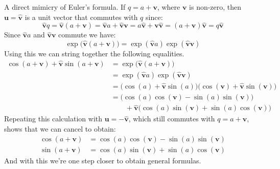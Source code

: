 \documentclass{article}
\begin{document}
            A direct mimicry of Euler's formula. If
            $q=a+\mathbf{v}$, where $\mathbf{v}$ is non-zero,
            then $\mathbf{u}=\hat{\mathbf{v}}$ is a unit vector that commutes
            with $q$ since:
            \begin{equation}
                \hat{\mathbf{v}}q
                =\hat{\mathbf{v}}(a+\mathbf{v})
                =\hat{\mathbf{v}}a+\hat{\mathbf{v}}\mathbf{v}
                =a\hat{\mathbf{v}}+\mathbf{v}\hat{\mathbf{v}}
                =(a+\mathbf{v})\hat{\mathbf{v}}
                =q\hat{\mathbf{v}}
            \end{equation}
            Since $\hat{\mathbf{v}}a$ and $\hat{\mathbf{v}}\mathbf{v}$ commute
            we have:
            \begin{equation}
                \exp\big(\hat{\mathbf{v}}(a+\mathbf{v})\big)=
                \exp(\hat{\mathbf{v}}a)\exp(\hat{\mathbf{v}}\mathbf{v})
            \end{equation}
            Using this we can string together the following equalities.
            \begin{subequations}
                \begin{align}
                    \cos(a+\mathbf{v})+\hat{\mathbf{v}}\sin(a+\mathbf{v})
                    &=\exp\big(\hat{\mathbf{v}}(a+\mathbf{v})\big)\\
                    &=\exp(\hat{\mathbf{v}}a)\exp(\hat{\mathbf{v}}\mathbf{v})\\
                    &=\Big(\cos(a)+\hat{\mathbf{v}}\sin(a)\Big)\Big(
                            \cos(\mathbf{v})+\hat{\mathbf{v}}\sin(\mathbf{v})
                        \Big)\\
                    &=\Big(\cos(a)\cos(\mathbf{v})-\sin(a)\sin(\mathbf{v})\Big)
                        \nonumber\\
                        &\hspace{2em}
                        +\hat{\mathbf{v}}\Big(
                            \cos(a)\sin(\mathbf{v})+\sin(a)\cos(\mathbf{v})
                        \Big)
                \end{align}
            \end{subequations}
            Repeating this calculation with $\mathbf{u}=-\hat{\mathbf{v}}$,
            which still commutes with $q=a+\mathbf{v}$, shows that we can cancel
            to obtain:
            \begin{align}
                \cos(a+\mathbf{v})
                &=\cos(a)\cos(\mathbf{v})-\sin(a)\sin(\mathbf{v})\\
                \sin(a+\mathbf{v})
                &=\cos(a)\sin(\mathbf{v})+\sin(a)\cos(\mathbf{v})
            \end{align}
            And with this we're one step closer to obtain general formulas.
\end{document}
